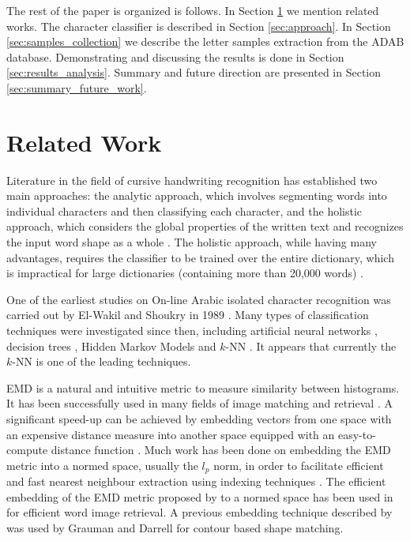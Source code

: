 \documentclass[10pt, conference, compsocconf]{IEEEtran}
\begin{document}
The rest of the paper is organized is follows. 
In Section \ref{sec:related_work} we mention related works. 
The character classifier is described in Section \ref{sec:approach}. 
In Section \ref{sec:samples_collection} we describe the letter samples extraction from the ADAB database.
Demonstrating and discussing the results is done in Section \ref{sec:results_analysis}.
Summary and future direction are presented in Section \ref{sec:summary_future_work}. 

\section{Related Work}
\label{sec:related_work}

Literature in the field of cursive handwriting recognition has established two main approaches: the analytic approach, which involves segmenting words into individual characters and then classifying each character\cite{abdulla2008off, sari2002off, Dinges2011}, and the holistic approach, which considers the global properties of the written text and recognizes the input word shape as a whole \cite{biadsy2011segmentation, saabni2009hierarchical}. 
The holistic approach, while having many advantages, requires the classifier to be trained over the entire dictionary, which is impractical for large dictionaries (containing more than 20,000 words) \cite{elanwar2012unconstrained}.

One of the earliest studies on On-line Arabic isolated character recognition was carried out by El-Wakil and Shoukry in 1989 \cite{el1989line}.
Many types of classification techniques were investigated since then, including artificial neural networks \cite{alijla2012oiahcr,ismail2012online}, decision trees \cite{ismail2012online}, Hidden Markov Models \cite{biadsy2006online} and $k$-NN \cite{elglaly2011isolated}.
It appears that currently the $k$-NN is one of the leading techniques.

EMD is a natural and intuitive metric to measure similarity between histograms. 
It has been successfully used in many fields of image matching and retrieval \cite{grauman2004fast, rubner2000earth}.
A significant speed-up can be achieved by embedding vectors from one space with an expensive distance measure into another space equipped with an easy-to-compute distance function \cite{saabni2013efficient}. 
Much work has been done on embedding the EMD metric into a normed space, usually the $l_p$ norm, in order to facilitate efficient and fast nearest neighbour extraction using indexing techniques \cite{bourgain1985lipschitz}. 
The efficient embedding of the EMD metric proposed by \cite{shirdhonkar2008approximate} to a normed space has been used in \cite{saabni2013efficient} for efficient word image retrieval.
A previous embedding technique described by \cite{indyk2003fast} was used by Grauman and Darrell \cite{grauman2004fast} for contour based shape matching.
\end{document}
